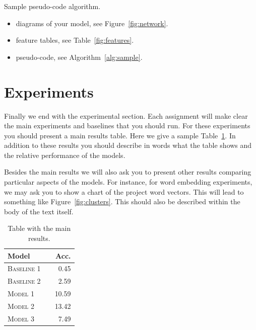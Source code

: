\documentclass[11pt]{article}
\begin{document}
\begin{algorithm}[t!]
  \small
  \begin{algorithmic}[1]
    \EndFor{}
    \EndFor{}
    \EndFor{}
    \EndFor{}
    \EndProcedure{}
  \end{algorithmic}
  \caption{\label{alg:sample} Sample pseudo-code algorithm.}
\end{algorithm}


\begin{itemize}
\item diagrams of your model, see Figure~\ref{fig:network}. 
\item feature tables, see Table~\ref{fig:features}. 
\item pseudo-code, see Algorithm~\ref{alg:sample}. 
\end{itemize}


\section{Experiments}

Finally we end with the experimental section. Each assignment will make clear the main experiments and baselines that you should run. For these experiments you should present a main results table. Here we give a sample Table~\ref{tab:results}. In addition to these results you should describe in words what the table shows and the relative performance of the models. 

Besides the main results we will also ask you to present other results comparing particular aspects of the models. For instance, for word embedding experiments, we may ask you to show a chart of the project word vectors. This will lead to something like Figure~\ref{fig:clusters}. This should also be described within the body of the text itself.


\begin{table}[h]
\centering
\begin{tabular}{llr}
 \toprule
 Model &  & Acc. \\
 \midrule
 \textsc{Baseline 1} & & 0.45\\
 \textsc{Baseline 2} & & 2.59 \\
 \textsc{Model 1} & & 10.59  \\
 \textsc{Model 2} & &13.42 \\
 \textsc{Model 3} & & 7.49\\
 \bottomrule
\end{tabular}
\caption{\label{tab:results} Table with the main results.}
\end{table}
\end{document}

